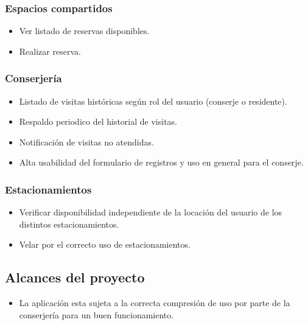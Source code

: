 \subsubsection{Espacios compartidos}
\begin{itemize}
	\item Ver listado de reservas disponibles.
	\item Realizar reserva.
\end{itemize}
\subsubsection{Conserjería}
\begin{itemize}
	\item Listado de visitas históricas según rol del usuario (conserje o residente).
	\item Respaldo periodico del historial de visitas.
	\item Notificación de visitas no atendidas.
	\item Alta usabilidad del formulario de registros y uso en general para el conserje.	
\end{itemize}
\subsubsection{Estacionamientos}
\begin{itemize}
	\item Verificar disponibilidad independiente de la locación del usuario de los distintos estacionamientos.
	\item Velar por el correcto uso de estacionamientos.
\end{itemize}

\subsection{Alcances del proyecto}
\begin{itemize}
	\item La aplicación esta sujeta a la correcta compresión de uso por parte de la conserjería para un buen funcionamiento.
\end{itemize}
